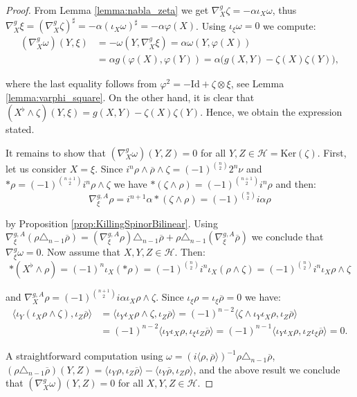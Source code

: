 \documentclass[10pt,a4paper,twoside,reqno]{amsart}
\theoremstyle{plain}
\theoremstyle{definition}
\theoremstyle{remark}
\def\Id{\mathrm{Id}}
\newcommand{\escal}[1]{\langle#1\rangle}
\renewcommand{\ker}{\mathrm{Ker}}
\begin{document}
\begin{proof}
From Lemma \ref{lemma:nabla_zeta} we get $\nabla^g_X\zeta=-\alpha\iota_X\omega$, thus $\nabla^g_X\xi=(\nabla^g_X\zeta)^\sharp=-\alpha(\iota_X\omega)^\sharp=-\alpha\varphi(X)$. Using $\iota_{\xi}\omega=0$ we compute:
\begin{align*}
(\nabla^g_X\omega)(Y,\xi)&=-\omega(Y,\nabla^g_X\xi)=\alpha\omega(Y,\varphi(X))\\
&=\alpha g(\varphi(X),\varphi(Y))=\alpha\big(g(X,Y)-\zeta(X)\zeta(Y)\big),
\end{align*}

\noindent
where the last equality follows from $\varphi^2=-\Id+\zeta\otimes\xi$, see Lemma \ref{lemma:varphi_square}. On the other hand, it is clear that $(X^\flat\wedge\zeta)(Y,\xi)=g(X,Y)-\zeta(X)\zeta(Y)$. Hence, we obtain the expression stated.\medskip

It remains to show that $(\nabla^g_X\omega)(Y,Z)=0$ for all $Y,Z\in\mathcal{H}=\ker(\zeta)$. First, let us consider $X=\xi$. Since $i^n\rho\wedge\overline{\rho}\wedge\zeta=(-1)^{\binom{n}{2}}2^n\nu$ and $*\rho=(-1)^{\binom{n+1}{2}}i^n\rho\wedge\zeta$ we have $*(\zeta\wedge\rho)=(-1)^{\binom{n+1}{2}}i^n\rho$ and then:
\begin{equation*}
\nabla^{g,A}_\xi\rho=i^{n+1}\alpha*(\zeta\wedge\rho)=(-1)^{\binom{n}{2}}i\alpha\rho
\end{equation*}

\noindent
by Proposition \ref{prop:KillingSpinorBilinear}. Using $\nabla^{g,A}_\xi(\rho\triangle_{n-1}\overline{\rho})=(\nabla^{g,A}_\xi\rho)\triangle_{n-1}\overline{\rho}+\rho\triangle_{n-1}(\nabla^{g,A}_\xi\overline{\rho})$ we conclude that $\nabla^g_\xi\omega=0$. Now assume that $X,Y,Z\in\mathcal{H}$. Then:
\begin{equation*}
*(X^\flat\wedge\rho)=(-1)^n\iota_X(*\rho)=(-1)^{\binom{n}{2}}i^n\iota_X(\rho\wedge\zeta)=(-1)^{\binom{n}{2}}i^n\iota_X\rho\wedge\zeta
\end{equation*}

\noindent
and $\nabla^{g,A}_X\rho=(-1)^{\binom{n+1}{2}}i\alpha\iota_X\rho\wedge\zeta$. Since $\iota_{\xi}\rho=\iota_{\xi}\overline{\rho}=0$ we have:
\begin{align*}
\escal{\iota_Y(\iota_X\rho\wedge\zeta),\iota_Z\overline{\rho}}&=\escal{\iota_Y\iota_X\rho\wedge\zeta,\iota_Z\overline{\rho}}=(-1)^{n-2}\escal{\zeta\wedge\iota_Y\iota_X\rho,\iota_Z\overline{\rho}}\\
&=(-1)^{n-2}\escal{\iota_Y\iota_X\rho,\iota_\xi\iota_Z\overline{\rho}}=(-1)^{n-1} \escal{\iota_Y\iota_X\rho ,\iota_Z\iota_\xi \overline{\rho}}=0.
\end{align*}

\noindent
A straightforward computation using $\omega=(i\escal{\rho,\overline{\rho}})^{-1}\rho\triangle_{n-1}\overline{\rho}$, $(\rho\triangle_{n-1}\overline{\rho})(Y,Z)=\escal{\iota_Y\rho,\iota_Z\overline{\rho}}-\escal{\iota_Y\overline{\rho},\iota_Z\rho}$, and the above result we conclude that $(\nabla^g_X\omega)(Y,Z)=0$ for all $X,Y,Z\in\mathcal{H}$.
\end{proof}
\end{document}
